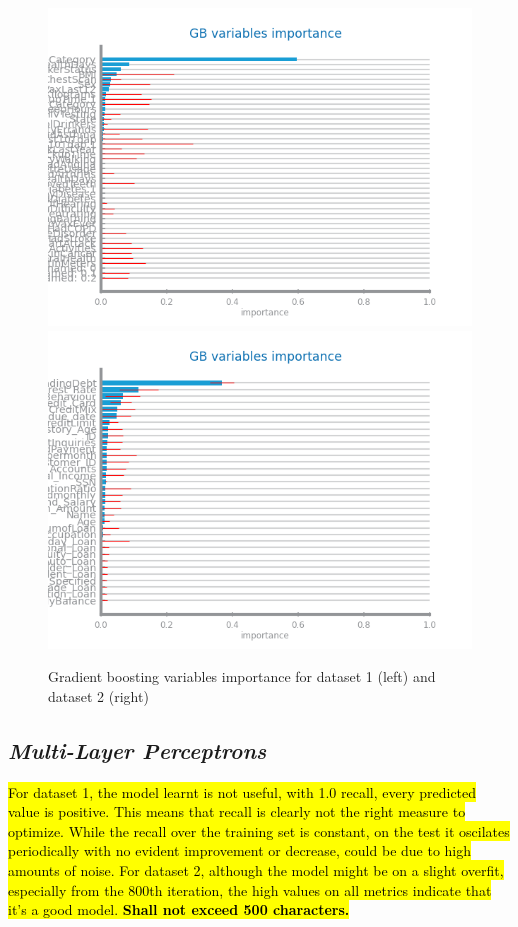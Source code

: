 \documentclass[10pt]{extarticle}
\newcommand{\ctext}[3][RGB]{%
  \begingroup
  \definecolor{hlcolor}{#1}{#2}\sethlcolor{hlcolor}%
  \hl{#3}%
  \endgroup
}
\begin{document}
\begin{figure}[H]
\centering\includegraphics[scale=0.7]{images/dataset1/models_evaluation/CovidPos_gb_recall_vars_ranking.png}
\includegraphics[scale=0.7]{images/dataset2/models_evaluation/Credit_Score_gb_accuracy_vars_ranking.png}
\caption{Gradient boosting variables importance for dataset 1 (left) and dataset 2 (right)}
\end{figure}

\subsection*{\textit{Multi-Layer Perceptrons}}
\ctext[RGB]{190,190,190}{For dataset 1, the model learnt is not useful, with 1.0 recall, every predicted value is positive. This means that recall is clearly not the right measure to optimize. While the recall over the training set is constant, on the test it oscilates periodically with no evident improvement or decrease, could be due to high amounts of noise.
For dataset 2, although the model might be on a slight overfit, especially from the 800th iteration, the high values on all metrics indicate that it's a good model. \textbf{Shall not exceed 500 characters.}}
\end{document}
